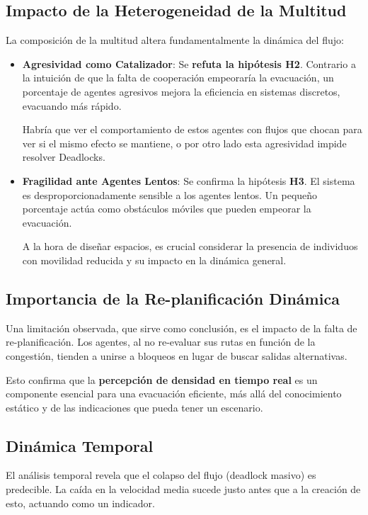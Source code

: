 \documentclass[11pt,spanish,listoffigures,listoftables]{tfgetsinf}
\begin{document}
\subsection{Impacto de la Heterogeneidad de la Multitud}
La composición de la multitud altera fundamentalmente la dinámica del flujo:
\begin{itemize}
    \item \textbf{Agresividad como Catalizador}: Se \textbf{refuta la hipótesis H2}. Contrario a la intuición de que la falta de cooperación empeoraría la evacuación, un porcentaje de agentes agresivos mejora la eficiencia en sistemas discretos, evacuando más rápido.
    
    Habría que ver el comportamiento de estos agentes con flujos que chocan para ver si el mismo efecto se mantiene, o por otro lado esta agresividad impide resolver Deadlocks.
    \item \textbf{Fragilidad ante Agentes Lentos}: Se confirma la hipótesis \textbf{H3}. El sistema es desproporcionadamente sensible a los agentes lentos. Un pequeño porcentaje actúa como obstáculos móviles que pueden empeorar la evacuación.
    
    A la hora de diseñar espacios, es crucial considerar la presencia de individuos con movilidad reducida y su impacto en la dinámica general.
\end{itemize}

\subsection{Importancia de la Re-planificación Dinámica}
Una limitación observada, que sirve como conclusión, es el impacto de la falta de re-planificación. Los agentes, al no re-evaluar sus rutas en función de la congestión, tienden a unirse a bloqueos en lugar de buscar salidas alternativas. 

Esto confirma que la \textbf{percepción de densidad en tiempo real} es un componente esencial para una evacuación eficiente, más allá del conocimiento estático y de las indicaciones que pueda tener un escenario.

\subsection{Dinámica Temporal}
El análisis temporal revela que el colapso del flujo (deadlock masivo) es predecible. La caída en la velocidad media sucede justo antes que a la creación de esto, actuando como un indicador. 
\end{document}
